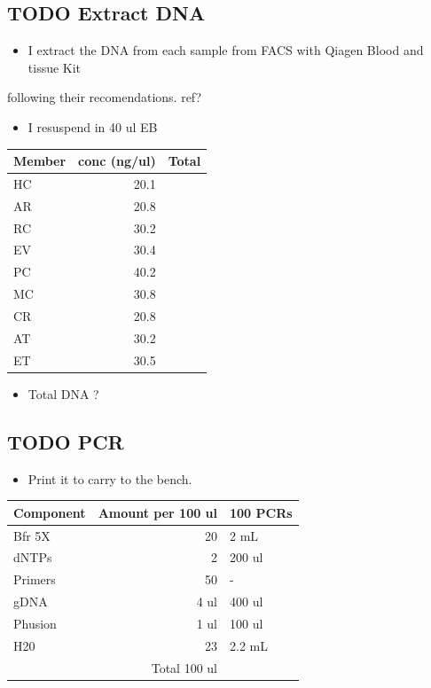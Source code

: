 \documentclass[11pt]{article}
\begin{document}
\subsection{{\bfseries\sffamily TODO} Extract DNA}
\label{sec:org362900c}
\begin{itemize}
\item I extract the DNA from each sample from FACS with Qiagen Blood and tissue Kit
\end{itemize}
following their recomendations. ref? 
\begin{itemize}
\item I resuspend in 40 ul EB
\end{itemize}

\begin{center}
\begin{tabular}{lrl}
Member & conc (ng/ul) & Total\\
\hline
HC & 20.1 & \\
AR & 20.8 & \\
RC & 30.2 & \\
EV & 30.4 & \\
PC & 40.2 & \\
MC & 30.8 & \\
CR & 20.8 & \\
AT & 30.2 & \\
ET & 30.5 & \\
\hline
\end{tabular}
\end{center}

\begin{itemize}
\item Total DNA ?
\end{itemize}
\subsection{{\bfseries\sffamily TODO} PCR}
\label{sec:orgb6158ba}
\begin{itemize}
\item Print it to carry to the bench.
\end{itemize}

\begin{center}
\begin{tabular}{lrl}
Component & Amount per 100 ul & 100 PCRs\\
\hline
Bfr 5X & 20 & 2 mL\\
dNTPs & 2 & 200 ul\\
Primers & 50 & -\\
gDNA & 4 ul & 400 ul\\
Phusion & 1 ul & 100 ul\\
H20 & 23 & 2.2 mL\\
\hline
 & Total  100 ul & \\
\end{tabular}
\end{center}
\end{document}
